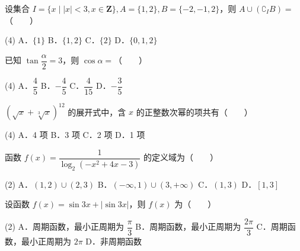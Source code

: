 

\begin{question}
设集合 $I = \{x \mid |x| < 3, x \in \mathbf{Z}\}, A = \{1, 2\}, B = \{-2, -1, 2\}$，则 $A \cup (\complement_I B) =$\mbox{（　　）}

\begin{gkopts}(4)
\task A．$\{1\}$
\task B．$\{1, 2\}$
\task C．$\{2\}$
\task D．$\{0, 1, 2\}$
\end{gkopts}

\end{question}
\begin{question}
已知 $\tan\dfrac{\alpha}{2} = 3$，则 $\cos\alpha =$\mbox{（　　）}

\begin{gkopts}(4)
\task A．$\dfrac{4}{5}$
\task B．$-\dfrac{4}{5}$
\task C．$\dfrac{4}{15}$
\task D．$-\dfrac{3}{5}$
\end{gkopts}

\end{question}
\begin{question}
$(\sqrt{x} + \sqrt[3]{x})^{12}$ 的展开式中，含 $x$ 的正整数次幂的项共有\mbox{（　　）}

\begin{gkopts}(4)
\task A．4 项
\task B．3 项
\task C．2 项
\task D．1 项
\end{gkopts}

\end{question}
\begin{question}
函数 $f(x) = \dfrac{1}{\log_2(-x^2 + 4x - 3)}$ 的定义域为\mbox{（　　）}

\begin{gkopts}(2)
\task A．$(1, 2) \cup (2, 3)$
\task B．$(-\infty, 1) \cup (3, +\infty)$
\task C．$(1, 3)$
\task D．$[1, 3]$
\end{gkopts}

\end{question}
\begin{question}
设函数 $f(x) = \sin 3x + |\sin 3x|$，则 $f(x)$ 为\mbox{（　　）}

\begin{gkopts}(2)
\task A．周期函数，最小正周期为 $\dfrac{\pi}{3}$
\task B．周期函数，最小正周期为 $\dfrac{2\pi}{3}$
\task C．周期函数，最小正周期为 $2\pi$
\task D．非周期函数
\end{gkopts}

\end{question}

